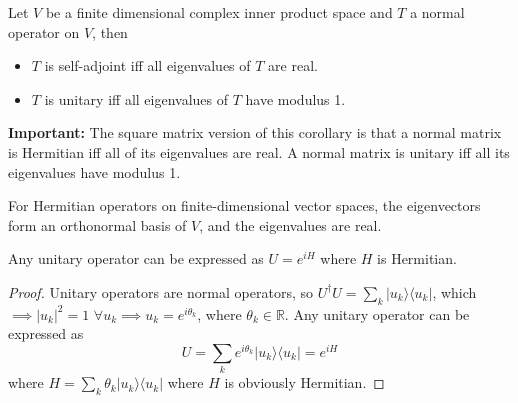 \documentclass[a4paper]{article}
\begin{document}
\begin{cor}
Let $V$ be a finite dimensional complex inner product space and $T$ a normal operator on $V$, then
\begin{itemize}
    \item $T$ is self-adjoint iff all eigenvalues of $T$ are real.
    \item $T$ is unitary iff all eigenvalues of $T$ have modulus 1.
\end{itemize}
\end{cor}
\textbf{Important:} The square matrix version of this corollary is that a normal matrix is Hermitian iff all of its eigenvalues are real. A normal matrix is unitary iff all its eigenvalues have modulus 1.
\begin{thm}
For Hermitian operators on finite-dimensional vector spaces, the eigenvectors form an orthonormal basis of $V$, and the eigenvalues are real.
\end{thm}
\begin{thm}
Any unitary operator can be expressed as $U=e^{iH}$ where $H$ is Hermitian.
\end{thm}
\begin{proof}
Unitary operators are normal operators, so $U^\dag U=\sum_k|u_k\rangle\langle u_k|$, which  $\implies|u_k|^2=1$ $\forall u_k\implies u_k=e^{i\theta_k}$, where $\theta_k\in\mathbb{R}$. Any unitary operator can be expressed as
$$U=\sum_ke^{i\theta_k}|u_k\rangle\langle u_k|=e^{iH}$$
where $H=\sum_k\theta_k|u_k\rangle\langle u_k|$ where $H$ is obviously Hermitian.
\end{proof}
\end{document}
